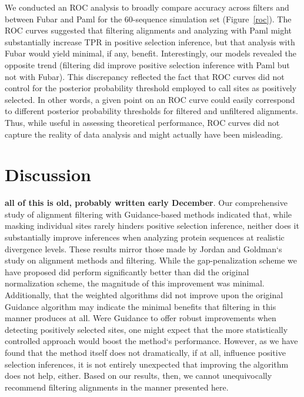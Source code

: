 \documentclass[10pt]{article}
\begin{document}
We conducted an ROC analysis to broadly compare accuracy across filters and between Fubar and Paml for the 60-sequence simulation set (Figure~\ref{roc}). The ROC curves suggested that filtering alignments and analyzing with Paml might substantially increase TPR in positive selection inference, but that analysis with Fubar would yield minimal, if any, benefit. Interestingly, our models revealed the opposite trend (filtering did improve positive selection inference with Paml but not with Fubar). This discrepancy reflected the fact that ROC curves did not control for the posterior probability threshold employed to call sites as positively selected. In other words, a given point on an ROC curve could easily correspond to different posterior probability thresholds for filtered and unfiltered alignments. Thus, while useful in assessing theoretical performance, ROC curves did not capture the reality of data analysis and might actually have been misleading.












\section*{Discussion}

\textbf{all of this is old, probably written early December}.
Our comprehensive study of alignment filtering with Guidance-based methods indicated that, while masking individual sites rarely hinders positive selection inference, neither does it substantially improve inferences when analyzing protein sequences at realistic divergence levels. These results mirror those made by Jordan and Goldman`s \citep{Jordan2011} study on alignment methods and filtering. While the gap-penalization scheme we have proposed did perform significantly better than did the original normalization scheme, the magnitude of this improvement was minimal. Additionally, that the weighted algorithms did not improve upon the original Guidance algorithm may indicate the minimal benefits that filtering in this manner produces at all. Were Guidance to offer robust improvements when detecting positively selected sites, one might expect that the more statistically controlled approach would boost the method`s performance. However, as we have found that the method itself does not dramatically, if at all, influence positive selection inferences, it is not entirely unexpected that improving the algorithm does not help, either. Based on our results, then, we cannot unequivocally recommend filtering alignments in the manner presented here. 
\end{document}

